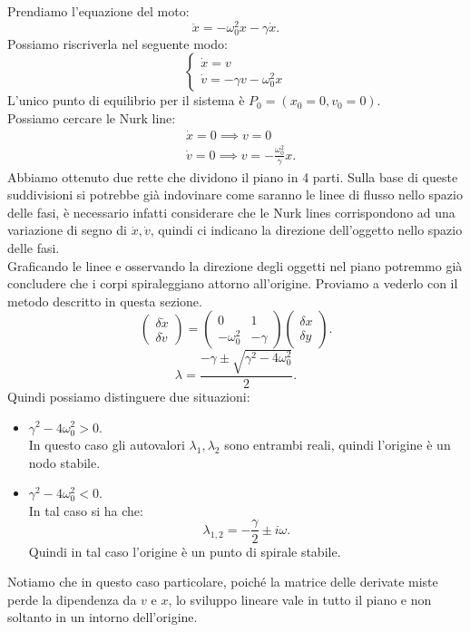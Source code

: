 \begin{exmp}
    Prendiamo l'equazione del moto:
    \[
        \ddot{x}=-\omega_0^2x -\gamma\dot{x}
    .\] 
    Possiamo riscriverla nel seguente modo:
    \[
        \begin{cases}
 	    \dot{x} = v\\
	    \dot{v}=-\gamma v - \omega_0^2x           
        \end{cases}
    \] 
    L'unico punto di equilibrio per il sistema è $P_0 = (x_0 = 0, v_0 = 0)$.\\
    Possiamo cercare le Nurk line: 
    \[\begin{aligned}
	& \dot{x}=0 \implies  v = 0\\
	& \dot{v}=0 \implies  v = -\frac{\omega_0^2}{\gamma}x
    .\end{aligned}\]
    Abbiamo ottenuto due rette che dividono il piano in 4 parti. Sulla base di queste suddivisioni si potrebbe già indovinare come saranno le linee di flusso nello spazio delle fasi, è necessario infatti considerare che le Nurk lines corrispondono ad una variazione di segno di $\dot{x}, \dot{v}$, quindi ci indicano la direzione dell'oggetto nello spazio delle fasi.\\
    Graficando le linee e osservando la direzione degli oggetti nel piano potremmo già concludere che i corpi spiraleggiano attorno all'origine. Proviamo a vederlo con il metodo descritto in questa sezione.
    \[
	\begin{pmatrix} \delta\dot{x} \\ \delta\dot{v} \end{pmatrix} =
	\begin{pmatrix} 
	    0 & 1\\
	    -\omega_0^2 & - \gamma
	\end{pmatrix} 
	\begin{pmatrix} \delta x \\ \delta y \end{pmatrix} 
    .\] 
    \[
        \lambda  = \frac{-\gamma  \pm \sqrt{\gamma^2 - 4\omega_0^2}}{2}
    .\] 
    Quindi possiamo distinguere due situazioni:
    \begin{itemize}
        \item  $\gamma^2 - 4\omega_0^2 > 0$. \\
	In questo caso gli autovalori $\lambda_1, \lambda_2$ sono entrambi reali, quindi l'origine è un nodo stabile.
    \item $\gamma^2 - 4\omega_0^2 < 0$.\\
	In tal caso si ha che:
	\[
	    \lambda_{1,2} = -\frac{\gamma}{2} \pm i \omega
	.\] 
	Quindi in tal caso l'origine è un punto di spirale stabile.
    \end{itemize}
    Notiamo che in questo caso particolare, poiché la matrice delle derivate miste perde la dipendenza da $v$ e $x$, lo sviluppo lineare vale in tutto il piano e non soltanto in un intorno dell'origine.
\end{exmp}
